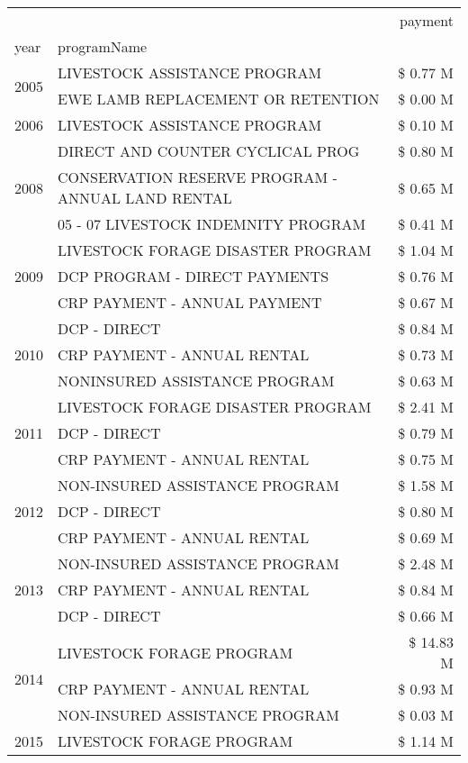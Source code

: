 \begin{tabular}{llr}
\toprule
 &  & payment \\
year & programName &  \\
\midrule
\multirow[t]{2}{*}{2005} & LIVESTOCK ASSISTANCE PROGRAM & \$ 0.77 M \\
 & EWE LAMB REPLACEMENT OR RETENTION & \$ 0.00 M \\
\cline{1-3}
2006 & LIVESTOCK ASSISTANCE PROGRAM & \$ 0.10 M \\
\cline{1-3}
\multirow[t]{3}{*}{2008} & DIRECT AND COUNTER CYCLICAL PROG & \$ 0.80 M \\
 & CONSERVATION RESERVE PROGRAM - ANNUAL LAND RENTAL & \$ 0.65 M \\
 & 05 - 07 LIVESTOCK INDEMNITY PROGRAM & \$ 0.41 M \\
\cline{1-3}
\multirow[t]{3}{*}{2009} & LIVESTOCK FORAGE DISASTER  PROGRAM & \$ 1.04 M \\
 & DCP PROGRAM - DIRECT PAYMENTS & \$ 0.76 M \\
 & CRP PAYMENT - ANNUAL PAYMENT & \$ 0.67 M \\
\cline{1-3}
\multirow[t]{3}{*}{2010} & DCP - DIRECT & \$ 0.84 M \\
 & CRP PAYMENT - ANNUAL RENTAL & \$ 0.73 M \\
 & NONINSURED ASSISTANCE PROGRAM & \$ 0.63 M \\
\cline{1-3}
\multirow[t]{3}{*}{2011} & LIVESTOCK FORAGE DISASTER PROGRAM & \$ 2.41 M \\
 & DCP - DIRECT & \$ 0.79 M \\
 & CRP PAYMENT - ANNUAL RENTAL & \$ 0.75 M \\
\cline{1-3}
\multirow[t]{3}{*}{2012} & NON-INSURED ASSISTANCE PROGRAM & \$ 1.58 M \\
 & DCP - DIRECT & \$ 0.80 M \\
 & CRP PAYMENT - ANNUAL RENTAL & \$ 0.69 M \\
\cline{1-3}
\multirow[t]{3}{*}{2013} & NON-INSURED ASSISTANCE PROGRAM & \$ 2.48 M \\
 & CRP PAYMENT - ANNUAL RENTAL & \$ 0.84 M \\
 & DCP - DIRECT & \$ 0.66 M \\
\cline{1-3}
\multirow[t]{3}{*}{2014} & LIVESTOCK FORAGE PROGRAM & \$ 14.83 M \\
 & CRP PAYMENT - ANNUAL RENTAL & \$ 0.93 M \\
 & NON-INSURED ASSISTANCE PROGRAM & \$ 0.03 M \\
\cline{1-3}
\multirow[t]{3}{*}{2015} & LIVESTOCK FORAGE PROGRAM & \$ 1.14 M \\

\end{tabular}
